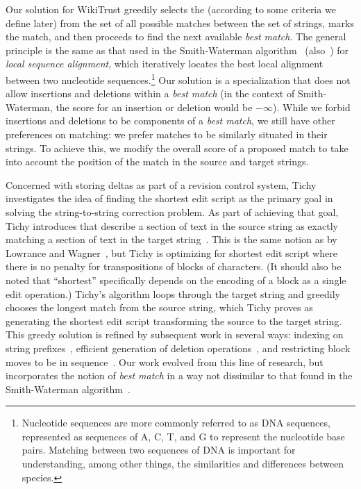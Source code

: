 Our solution for WikiTrust greedily selects the 
(according to some criteria we define later)
from the set of all possible matches between the set of strings, marks
the match, and then proceeds to find the next available \textit{best match}.
The general principle is the same as that used in the
Smith-Waterman algorithm~\cite{Smith1981} (also~\cite[Ch.~10]{Sankoff1999})
for \textit{local sequence alignment}, which iteratively locates the
best local alignment between two nucleotide
sequences.\footnote{Nucleotide sequences are more commonly referred to
as DNA sequences, represented as sequences of A, C, T, and G to
represent the nucleotide base pairs.  Matching between two sequences of
DNA is important for understanding, among other things, the similarities
and differences between species.}
Our solution is a specialization that does not allow insertions
and deletions within a \textit{best match} (in the context of
Smith-Waterman, the score for an insertion or deletion would be $-\infty$).
While we forbid insertions and deletions to be components of
a \textit{best match}, we still have other preferences on matching:
we prefer matches to be similarly situated in their strings.
To achieve this, we modify the overall score of a proposed match to take
into account the position of the match in the source and target strings.

Concerned with storing deltas as part of a revision control system,
Tichy investigates the idea of finding the shortest edit script as
the primary goal in solving the string-to-string correction problem.
As part of achieving that goal, Tichy introduces 
that describe a section of text in the source string as exactly matching
a section of text in the target string~\cite{Tichy1984}.
This is the same notion as  by
Lowrance and Wagner~\cite{Lowrance1975}, but Tichy is optimizing
for shortest edit script where there is no penalty for transpositions
of blocks of characters.
(It should also be noted that ``shortest'' specifically depends on
the encoding of a block as a single edit operation.)
Tichy's algorithm loops through the target string and greedily chooses
the longest match from the source string, which Tichy proves as
generating the shortest edit script transforming the source to the
target string.
This greedy solution is refined by subsequent work in several ways:
indexing on string prefixes~\cite{Obst1987},
efficient generation of deletion operations~\cite{Reichenberger1991},
and restricting block moves to be in sequence~\cite{Burns1997}.
Our work evolved from this line of research, but
incorporates the notion of \textit{best match}
in a way not dissimilar to that found in the Smith-Waterman
algorithm~\cite{Smith1981}.

